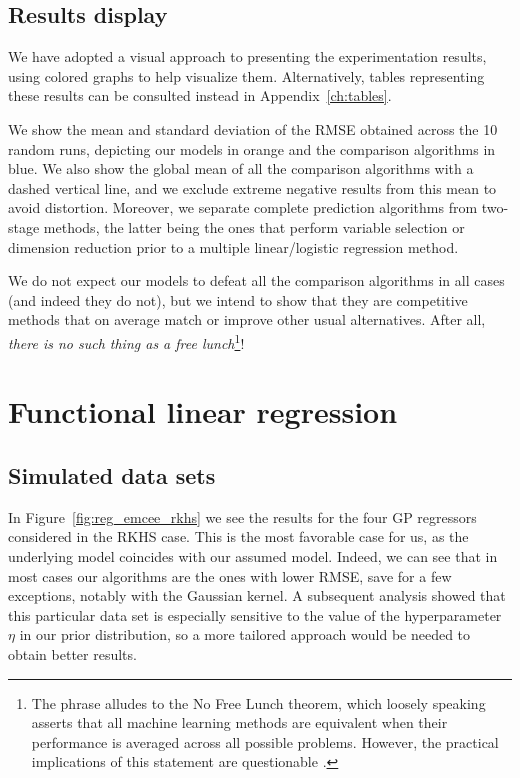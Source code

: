 \subsection*{Results display}

We have adopted a visual approach to presenting the experimentation results, using colored graphs to help visualize them. Alternatively, tables representing these results can be consulted instead in Appendix~\ref{ch:tables}.

We show the mean and standard deviation of the RMSE obtained across the 10 random runs, depicting our models in orange and the comparison algorithms in blue. We also show the global mean of all the comparison algorithms with a dashed vertical line, and we exclude extreme negative results from this mean to avoid distortion. Moreover, we separate complete prediction algorithms from two-stage methods, the latter being the ones that perform variable selection or dimension reduction prior to a multiple linear/logistic regression method.

We do not expect our models to defeat all the comparison algorithms in all cases (and indeed they do not), but we intend to show that they are competitive methods that on average match or improve other usual alternatives. After all, \textit{there is no such thing as a free lunch}\footnote{The phrase alludes to the No Free Lunch theorem, which loosely speaking asserts that all machine learning methods are equivalent when their performance is averaged across all possible problems. However, the practical implications of this statement are questionable \citep[see e.g.][]{giraud2005toward}.}!

\section{Functional linear regression}

\subsection*{Simulated data sets}

In Figure~\ref{fig:reg_emcee_rkhs} we see the results for the four GP regressors considered in the RKHS case. This is the most favorable case for us, as the underlying model coincides with our assumed model. Indeed, we can see that in most cases our algorithms are the ones with lower RMSE, save for a few exceptions, notably with the Gaussian kernel. A subsequent analysis showed that this particular data set is especially sensitive to the value of the hyperparameter \(\eta\) in our prior distribution, so a more tailored approach would be needed to obtain better results.

